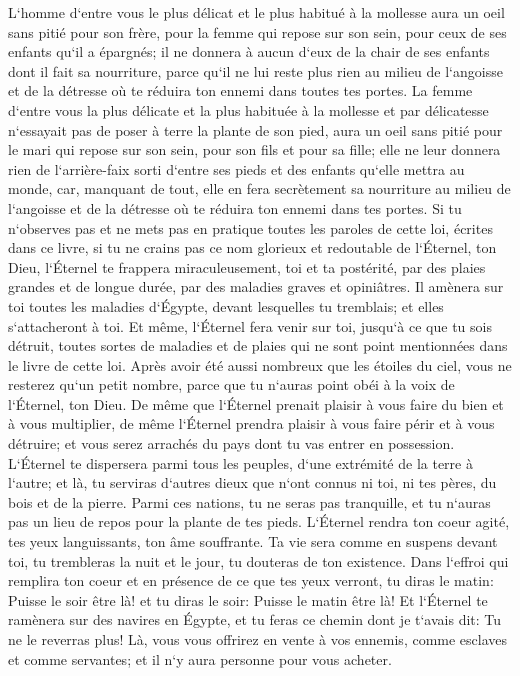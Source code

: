 \verse L`homme d`entre vous le plus délicat et le plus habitué à la mollesse aura un oeil sans pitié pour son frère, pour la femme qui repose sur son sein, pour ceux de ses enfants qu`il a épargnés; 
\verse il ne donnera à aucun d`eux de la chair de ses enfants dont il fait sa nourriture, parce qu`il ne lui reste plus rien au milieu de l`angoisse et de la détresse où te réduira ton ennemi dans toutes tes portes. 
\verse La femme d`entre vous la plus délicate et la plus habituée à la mollesse et par délicatesse n`essayait pas de poser à terre la plante de son pied, aura un oeil sans pitié pour le mari qui repose sur son sein, pour son fils et pour sa fille; 
\verse elle ne leur donnera rien de l`arrière-faix sorti d`entre ses pieds et des enfants qu`elle mettra au monde, car, manquant de tout, elle en fera secrètement sa nourriture au milieu de l`angoisse et de la détresse où te réduira ton ennemi dans tes portes. 
\verse Si tu n`observes pas et ne mets pas en pratique toutes les paroles de cette loi, écrites dans ce livre, si tu ne crains pas ce nom glorieux et redoutable de l`Éternel, ton Dieu, 
\verse l`Éternel te frappera miraculeusement, toi et ta postérité, par des plaies grandes et de longue durée, par des maladies graves et opiniâtres. 
\verse Il amènera sur toi toutes les maladies d`Égypte, devant lesquelles tu tremblais; et elles s`attacheront à toi. 
\verse Et même, l`Éternel fera venir sur toi, jusqu`à ce que tu sois détruit, toutes sortes de maladies et de plaies qui ne sont point mentionnées dans le livre de cette loi. 
\verse Après avoir été aussi nombreux que les étoiles du ciel, vous ne resterez qu`un petit nombre, parce que tu n`auras point obéi à la voix de l`Éternel, ton Dieu. 
\verse De même que l`Éternel prenait plaisir à vous faire du bien et à vous multiplier, de même l`Éternel prendra plaisir à vous faire périr et à vous détruire; et vous serez arrachés du pays dont tu vas entrer en possession. 
\verse L`Éternel te dispersera parmi tous les peuples, d`une extrémité de la terre à l`autre; et là, tu serviras d`autres dieux que n`ont connus ni toi, ni tes pères, du bois et de la pierre. 
\verse Parmi ces nations, tu ne seras pas tranquille, et tu n`auras pas un lieu de repos pour la plante de tes pieds. L`Éternel rendra ton coeur agité, tes yeux languissants, ton âme souffrante. 
\verse Ta vie sera comme en suspens devant toi, tu trembleras la nuit et le jour, tu douteras de ton existence. 
\verse Dans l`effroi qui remplira ton coeur et en présence de ce que tes yeux verront, tu diras le matin: Puisse le soir être là! et tu diras le soir: Puisse le matin être là! 
\verse Et l`Éternel te ramènera sur des navires en Égypte, et tu feras ce chemin dont je t`avais dit: Tu ne le reverras plus! Là, vous vous offrirez en vente à vos ennemis, comme esclaves et comme servantes; et il n`y aura personne pour vous acheter. 

